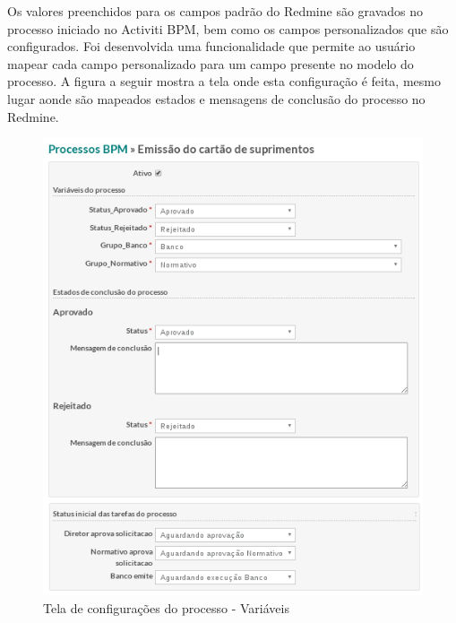 Os valores preenchidos para os campos padrão do Redmine são gravados no processo iniciado no Activiti BPM, bem como os campos personalizados que são configurados. Foi desenvolvida uma funcionalidade que permite ao usuário mapear cada campo personalizado para um campo presente no modelo do processo. A figura a seguir mostra a tela onde esta configuração é feita, mesmo lugar aonde são mapeados estados e mensagens de conclusão do processo no Redmine.

\begin{figure}[H]
\centering
\includegraphics[width=1\textwidth]{imagens/plugin_process_settings1.png}
\caption{Tela de configurações do processo - Variáveis}
\label{fig:plugin_process_settings}
\end{figure}


